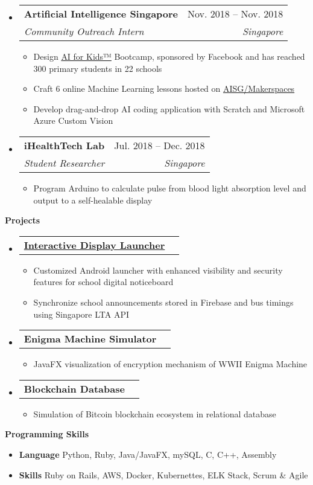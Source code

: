 \documentclass[letterpaper,12pt]{article}[leftmargin=*]
\makeatletter
\def \entryspacing {-0pt}
\renewcommand{\section}[2]{\vspace{5pt}
  \colorbox{secondary}{\color{white}\raggedbottom\normalsize\textbf{{#1}{\hspace{7pt}#2}}}
}
\newcommand{\resumeEntryStart}{\begin{itemize}[leftmargin=2.5mm]}
\newcommand{\resumeEntryEnd}{\end{itemize}\vspace{\entryspacing}}
\newcommand{\resumeItemListStart}{\begin{itemize}[leftmargin=4.5mm]}
\newcommand{\resumeItemListEnd}{\end{itemize}}
\newcommand{\resumeItem}[1]{
  \item\small{
    {#1 \vspace{-2pt}}
  }
}
\newcommand{\resumeEntryTSDL}[4]{
  \vspace{-1pt}\item[]
    \begin{tabularx}{0.97\textwidth}{X@{\hspace{60pt}}r}
      \textbf{\color{primary}#1} & {\firabook\color{accent}\small#2} \\
      \textit{\color{accent}\small#3} & \textit{\color{accent}\small#4} \\
    \end{tabularx}\vspace{-6pt}
}
\newcommand{\resumeEntryTD}[2]{
  \vspace{-1pt}\item[]
    \begin{tabularx}{0.97\textwidth}{X@{\hspace{60pt}}r}
      \textbf{\color{primary}#1} & {\firabook\color{accent}\small#2} \\
    \end{tabularx}\vspace{-6pt}
}
\newcommand{\resumeEntryS}[2]{
  \item[]\small{
    \textbf{\color{primary}#1 }{ #2 \vspace{-6pt}}
  }
}
\makeatother
\begin{document}
  \resumeEntryStart
    \resumeEntryTSDL
      {Artificial Intelligence Singapore}{Nov. 2018 -- Nov. 2018}
      {Community Outreach Intern}{Singapore}
    \resumeItemListStart
      \resumeItem {Design \href{https://www.aisingapore.org/talentdevelopment/ai4k/}{AI for Kids™} Bootcamp, sponsored by Facebook and has reached 300 primary students in 22 schools}
      \resumeItem {Craft 6 online Machine Learning lessons hosted on \href{https://makerspace.aisingapore.org/courses/ai4k/}{AISG/Makerspaces}}
      \resumeItem {Develop drag-and-drop AI coding application with Scratch and Microsoft Azure Custom Vision}
    \resumeItemListEnd
  \resumeEntryEnd
  
  \resumeEntryStart
    \resumeEntryTSDL
      {iHealthTech Lab}{Jul. 2018 -- Dec. 2018}
      {Student Researcher}{Singapore}
    \resumeItemListStart
      \resumeItem {Program Arduino to calculate pulse from blood light absorption level and output to a self-healable display}
    \resumeItemListEnd
  \resumeEntryEnd

\section{\faFlask}{Projects}

  \resumeEntryStart
    \resumeEntryTD
      {\href{https://github.com/cnlinh/interactive-display-launcher/}{Interactive Display Launcher}}{}
    \resumeItemListStart
      \resumeItem {Customized Android launcher with enhanced visibility and security features for school digital noticeboard}
      \resumeItem {Synchronize school announcements stored in Firebase and bus timings using Singapore LTA API}
    \resumeItemListEnd
  \resumeEntryEnd
  
  \resumeEntryStart
    \resumeEntryTD
      {Enigma Machine Simulator}{}
    \resumeItemListStart
      \resumeItem {JavaFX visualization of encryption mechanism of WWII Enigma Machine}
    \resumeItemListEnd
  \resumeEntryEnd

  \resumeEntryStart
    \resumeEntryTD
      {Blockchain Database}{}
    \resumeItemListStart
      \resumeItem {Simulation of Bitcoin blockchain ecosystem in relational database}
    \resumeItemListEnd
  \resumeEntryEnd

\section{\faGears}{Programming Skills}
 \resumeEntryStart
  \resumeEntryS{Language } {Python, Ruby, Java/JavaFX, mySQL, C, C++, Assembly}
  \resumeEntryS{Skills } {Ruby on Rails, AWS, Docker, Kubernettes, ELK Stack, Scrum \& Agile}
 \resumeEntryEnd
\end{document}

